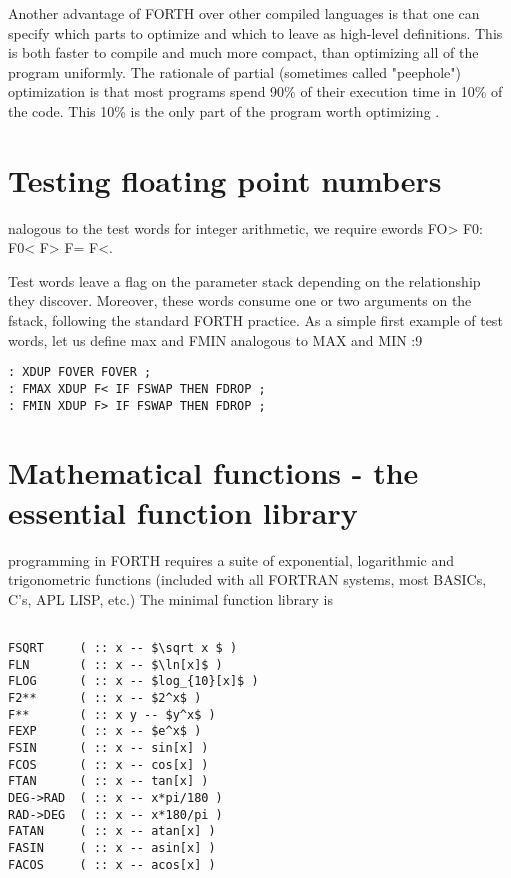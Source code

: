 Another advantage of FORTH over other compiled languages is
that one can specify which parts to optimize and which to leave
as high-level definitions. This is both faster to compile and much
more compact, than optimizing all of the program uniformly. The
rationale of partial (sometimes called "peephole") optimization
is that most programs spend 90\% of their execution time in 10\%
of the code. This 10\% is the only part of the program worth
optimizing .

\section{Testing floating point numbers}

 nalogous to the test words for integer arithmetic, we require
ewords FO> F0: F0< F> F= F<.

Test words leave a ﬂag on the parameter stack depending on the
relationship they discover. Moreover, these words consume one
or two arguments on the fstack, following the standard FORTH
practice. As a simple first example of test words, let us define
max and FMIN analogous to MAX and MIN :9
\begin{verbatim}
: XDUP FOVER FOVER ;
: FMAX XDUP F< IF FSWAP THEN FDROP ;
: FMIN XDUP F> IF FSWAP THEN FDROP ;
\end{verbatim}

\section{Mathematical functions - the essential function library}

 programming in FORTH requires a suite of exponential,
logarithmic and trigonometric functions (included with all
FORTRAN systems, most BASICs, C’s, APL LISP, etc.) The
minimal function library is

\begin{verbatim}

FSQRT     ( :: x -- $\sqrt x $ )
FLN       ( :: x -- $\ln[x]$ )
FLOG      ( :: x -- $log_{10}[x]$ )
F2**      ( :: x -- $2^x$ )
F**       ( :: x y -- $y^x$ )
FEXP      ( :: x -- $e^x$ )
FSIN      ( :: x -- sin[x] )
FCOS      ( :: x -- cos[x] )
FTAN      ( :: x -- tan[x] )
DEG->RAD  ( :: x -- x*pi/180 )
RAD->DEG  ( :: x -- x*180/pi )
FATAN     ( :: x -- atan[x] )
FASIN     ( :: x -- asin[x] )
FACOS     ( :: x -- acos[x] )

\end{verbatim}

